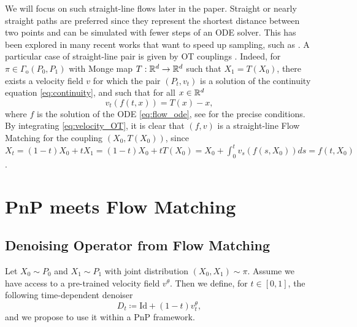 \documentclass{article} %
\newcommand{\Id}{\mathrm{Id}}
\theoremstyle{definition}
\begin{document}
We will focus on such straight-line flows later in the paper. Straight or nearly straight paths are preferred since they represent the shortest distance between two points and can be simulated with fewer steps of an ODE solver. This has been explored in many recent works that want to speed up sampling, such as \citet{kornilov2024optimal, pmlr-v202-lee23j, yang2024consistencyflowmatchingdefining}.  A particular case of straight-line pair is given by OT couplings \citep{pooladian2023multisample, tong2024improving}. Indeed, for $\pi \in \Gamma_{\text{o}}(P_0, P_1)$ with Monge map $T: \mathbb{R}^d \to \mathbb{R}^d$ such that $X_1=T(X_0)$, there exists a velocity field $v$ for which the pair $(P_t, v_t)$ is a solution of the continuity equation \eqref{eq:continuity}, and such that for all $x \in \mathbb{R}^d$
\begin{equation} \label{eq:velocity_OT}
    v_t (f(t, x)) = T(x) - x,
\end{equation}
where $f$ is the solution of the ODE \eqref{eq:flow_ode}, see \citet{ambrosio2008, pooladian2023multisample, CHSW2024} for the precise conditions. By integrating \eqref{eq:velocity_OT}, it is clear that $(f, v)$ is a straight-line Flow Matching for the coupling $(X_0, T(X_0))$, since $X_t = (1-t)X_0 + tX_1 = (1-t)X_0 + tT(X_0) = X_0 + \int_0^t v_s(f(s,X_0)) ds = f(t,X_0)$.



\section{PnP meets Flow Matching}
\subsection{Denoising Operator from Flow Matching}
Let $X_0 \sim P_0$ and $X_1 \sim P_1$ with joint distribution $(X_0, X_1) \sim \pi$. Assume we have access to a pre-trained velocity field $v^\theta$. Then we define, for $t\in [0,1]$, the following time-dependent denoiser
\begin{equation} \label{eq:denoiser}
    D_t  \coloneqq \Id + (1-t) v^\theta_t,
\end{equation}
and we propose to use it within a PnP framework. 
\end{document}

